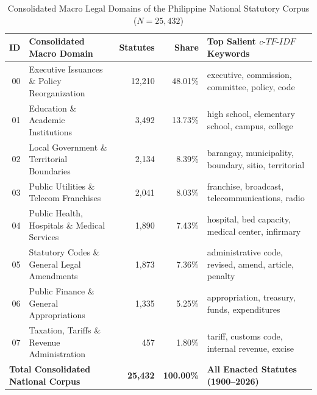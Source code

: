         \begin{table}[htbp]
            \centering
            \footnotesize
            \caption[Consolidated Macro Legal Domains of the National Statutory Corpus]{Consolidated Macro Legal Domains of the Philippine National Statutory Corpus ($N = 25,432$)}
            \label{tab:national_macro_domains}
            \begin{tabularx}{\linewidth}{r>{\RaggedRight}p{5.8cm}rr>{\RaggedRight}X}
                \toprule
                \textbf{ID} & \textbf{Consolidated Macro Domain} & \textbf{Statutes} & \textbf{Share} & \textbf{Top Salient $c\text{-}TF\text{-}IDF$ Keywords} \\
                \midrule
                00 & Executive Issuances \& Policy Reorganization & 12,210 & 48.01\% & executive, commission, committee, policy, code \\
                01 & Education \& Academic Institutions & 3,492 & 13.73\% & high school, elementary school, campus, college \\
                02 & Local Government \& Territorial Boundaries & 2,134 & 8.39\% & barangay, municipality, boundary, sitio, territorial \\
                03 & Public Utilities \& Telecom Franchises & 2,041 & 8.03\% & franchise, broadcast, telecommunications, radio \\
                04 & Public Health, Hospitals \& Medical Services & 1,890 & 7.43\% & hospital, bed capacity, medical center, infirmary \\
                05 & Statutory Codes \& General Legal Amendments & 1,873 & 7.36\% & administrative code, revised, amend, article, penalty \\
                06 & Public Finance \& General Appropriations & 1,335 & 5.25\% & appropriation, treasury, funds, expenditures \\
                07 & Taxation, Tariffs \& Revenue Administration & 457 & 1.80\% & tariff, customs code, internal revenue, excise \\
                \midrule
                \multicolumn{2}{l}{\textbf{Total Consolidated National Corpus}} & \textbf{25,432} & \textbf{100.00\%} & \textbf{All Enacted Statutes (1900--2026)} \\
                \bottomrule
            \end{tabularx}
        \end{table}

